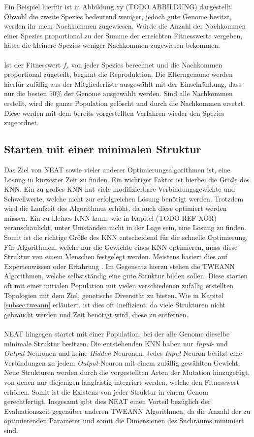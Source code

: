 Ein Beispiel hierfür ist in Abbildung xy (TODO ABBILDUNG) dargestellt. Obwohl die zweite Spezies bedeutend weniger, jedoch gute Genome besitzt, werden ihr mehr Nachkommen zugewiesen. Würde die Anzahl der Nachkommen einer Spezies proportional zu der Summe der erreichten Fitnesswerte vergeben, hätte die kleinere Spezies weniger Nachkommen zugewiesen bekommen. 
\\\\
Ist der Fitnesswert $f_s$ von jeder Spezies berechnet und die Nachkommen proportional zugeteilt, beginnt die Reproduktion. Die Elterngenome werden hierfür zufällig aus der Mitgliederliste ausgewählt mit der Einschränkung, dass nur die besten $50\%$ der Genome ausgewählt werden. Sind alle Nachkommen erstellt, wird die ganze Population gelöscht und durch die Nachkommen ersetzt. Diese werden mit dem bereits vorgestellten Verfahren wieder den Spezies zugeordnet.
\subsection{Starten mit einer minimalen Struktur}
\label{subsec:neat_minimal_structure}
Das Ziel von \ac{NEAT} sowie vieler anderer Optimierungsalgorithmen ist, eine Lösung in kürzester Zeit zu finden. Ein wichtiger Faktor ist hierbei die Größe des \ac{KNN}. Ein zu großes \ac{KNN} hat viele modifizierbare Verbindungsgewichte und Schwellwerte, welche nicht zur erfolgreichen Lösung benötigt werden. Trotzdem wird die Laufzeit des Algorithmus erhöht, da auch diese optimiert werden müssen. Ein zu kleines \ac{KNN} kann, wie in Kapitel (TODO REF XOR) veranschaulicht, unter Umständen nicht in der Lage sein, eine Lösung zu finden. Somit ist die richtige Größe des \ac{KNN} entscheidend für die schnelle Optimierung. Für Algorithmen, welche nur die Gewichte eines \ac{KNN} optimieren, muss diese Struktur von einem Menschen festgelegt werden. Meistens basiert dies auf Expertenwissen oder Erfahrung \cite{stanley2017oreilly}. Im Gegensatz hierzu stehen die \ac{TWEANN} Algorithmen, welche selbstständig eine gute Struktur bilden sollen. Diese starten oft mit einer initialen Population mit vielen verschiedenen zufällig erstellten Topologien mit dem Ziel, genetische Diversität zu bieten. Wie in Kapitel \ref{subsec:tweann} erläutert, ist dies oft ineffizient, da viele Strukturen nicht gebraucht werden und Zeit benötigt wird, diese zu entfernen.
\\\\
\ac{NEAT} hingegen startet mit einer Population, bei der alle Genome dieselbe minimale Struktur besitzen. Die entstehenden \ac{KNN} haben nur \emph{Input}- und \emph{Output}-Neuronen und keine \emph{Hidden}-Neuronen. Jedes \emph{Input}-Neuron besitzt eine Verbindungen zu jedem \emph{Output}-Neuron mit einem zufällig gewählten Gewicht. Neue Strukturen werden durch die vorgestellten Arten der Mutation hinzugefügt, von denen nur diejenigen langfristig integriert werden, welche den Fitnesswert erhöhen. Somit ist die Existenz von jeder Struktur in einem Genom gerechtfertigt. Insgesamt gibt dies \ac{NEAT} einen Vorteil bezüglich der Evaluationszeit gegenüber anderen \ac{TWEANN} Algorithmen, da die Anzahl der zu optimierenden Parameter und somit die Dimensionen des Suchraums minimiert sind.